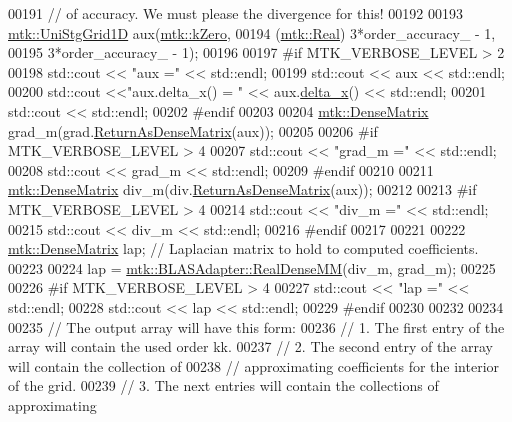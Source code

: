 \begin{DoxyCode}
00191   \textcolor{comment}{// of accuracy. We must please the divergence for this!}
00192 
00193   \hyperlink{classmtk_1_1UniStgGrid1D}{mtk::UniStgGrid1D} aux(\hyperlink{group__c01-roots_ga59a451a5fae30d59649bcda274fea271}{mtk::kZero},
00194                         (\hyperlink{group__c01-roots_gac080bbbf5cbb5502c9f00405f894857d}{mtk::Real}) 3*order\_accuracy\_ - 1,
00195                         3*order\_accuracy\_ - 1);
00196 
00197 \textcolor{preprocessor}{  #if MTK\_VERBOSE\_LEVEL > 2}
00198   std::cout << \textcolor{stringliteral}{"aux ="} << std::endl;
00199   std::cout << aux << std::endl;
00200   std::cout <<\textcolor{stringliteral}{"aux.delta\_x() = "} << aux.\hyperlink{classmtk_1_1UniStgGrid1D_a6e7173b01241632cf509496d66b9f74c}{delta\_x}() << std::endl;
00201   std::cout << std::endl;
00202 \textcolor{preprocessor}{  #endif}
00203 
00204   \hyperlink{classmtk_1_1DenseMatrix}{mtk::DenseMatrix} grad\_m(grad.\hyperlink{classmtk_1_1Grad1D_a77b2eddbe4ab03f469306c604d505b1a}{ReturnAsDenseMatrix}(aux));
00205 
00206 \textcolor{preprocessor}{  #if MTK\_VERBOSE\_LEVEL > 4}
00207   std::cout << \textcolor{stringliteral}{"grad\_m ="} << std::endl;
00208   std::cout << grad\_m << std::endl;
00209 \textcolor{preprocessor}{  #endif}
00210 
00211   \hyperlink{classmtk_1_1DenseMatrix}{mtk::DenseMatrix} div\_m(div.\hyperlink{classmtk_1_1Div1D_a213fddbaaf86e4840c6a9649b69c2d49}{ReturnAsDenseMatrix}(aux));
00212 
00213 \textcolor{preprocessor}{  #if MTK\_VERBOSE\_LEVEL > 4}
00214   std::cout << \textcolor{stringliteral}{"div\_m ="} << std::endl;
00215   std::cout << div\_m << std::endl;
00216 \textcolor{preprocessor}{  #endif}
00217 
00221 
00222   \hyperlink{classmtk_1_1DenseMatrix}{mtk::DenseMatrix} lap; \textcolor{comment}{// Laplacian matrix to hold to computed coefficients.}
00223 
00224   lap = \hyperlink{classmtk_1_1BLASAdapter_acebd0e9bfe0bdd609c7fbea98ccfd3b5}{mtk::BLASAdapter::RealDenseMM}(div\_m, grad\_m);
00225 
00226 \textcolor{preprocessor}{  #if MTK\_VERBOSE\_LEVEL > 4}
00227   std::cout << \textcolor{stringliteral}{"lap ="} << std::endl;
00228   std::cout << lap << std::endl;
00229 \textcolor{preprocessor}{  #endif}
00230 
00232 
00234 
00235   \textcolor{comment}{// The output array will have this form:}
00236   \textcolor{comment}{// 1. The first entry of the array will contain the used order kk.}
00237   \textcolor{comment}{// 2. The second entry of the array will contain the collection of}
00238   \textcolor{comment}{// approximating coefficients for the interior of the grid.}
00239   \textcolor{comment}{// 3. The next entries will contain the collections of approximating}

\end{DoxyCode}

